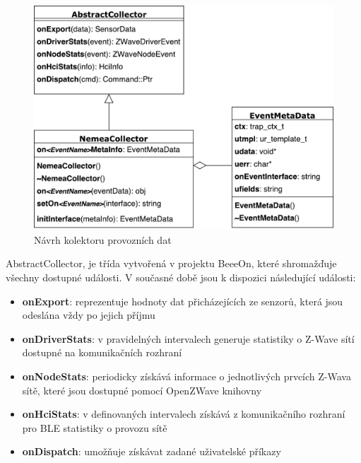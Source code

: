  \begin{figure}[ht]
   \begin{center}
   \includegraphics[scale=0.5]{pictures/modelTrid}
   \caption{Návrh kolektoru provozních dat}
   \label{obr.modelTrid}
   \end{center}
   \end{figure}
 
 AbstractCollector, je třída vytvořená v projektu BeeeOn, které shromažďuje všechny dostupné události.
 V současné době jsou k dispozici následující události:
 \begin{itemize}
  \item \textbf{onExport}:
   reprezentuje hodnoty dat přicházejících ze senzorů, která jsou odeslána vždy po jejich příjmu
   
  \item \textbf{onDriverStats}:
   v pravidelných intervalech generuje statistiky o Z-Wave sítí dostupné na komunikačních 
   rozhraní
   
  \item \textbf{onNodeStats}:
   periodicky získává informace o jednotlivých prvcích Z-Wava sítě, které jsou dostupné pomocí
   OpenZWave knihovny
   
  \item \textbf{onHciStats}:
   v definovaných intervalech získává z komunikačního rozhraní pro BLE statistiky o provozu
   sítě
  
  \item \textbf{onDispatch}:
  umožňuje získávat zadané uživatelské příkazy
 \end{itemize}

